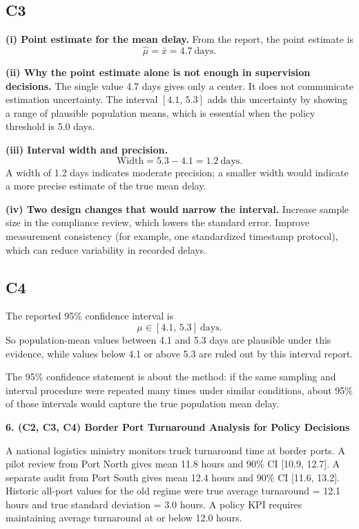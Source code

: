 \begin{ExamProblems}
		\subsection*{C3}
		\textbf{(i) Point estimate for the mean delay.}
		From the report, the point estimate is
		\[
		\hat{\mu}=\bar{x}=4.7\ \text{days}.
		\]
		
		\textbf{(ii) Why the point estimate alone is not enough in supervision decisions.}
		The single value 4.7 days gives only a center.
		It does not communicate estimation uncertainty.
		The interval $[4.1,\,5.3]$ adds this uncertainty by showing a range of plausible population means, which is essential when the policy threshold is 5.0 days.
		
		\textbf{(iii) Interval width and precision.}
		\[
		\text{Width}=5.3-4.1=1.2\ \text{days}.
		\]
		A width of 1.2 days indicates moderate precision; a smaller width would indicate a more precise estimate of the true mean delay.
		
		\textbf{(iv) Two design changes that would narrow the interval.}
		Increase sample size in the compliance review, which lowers the standard error.
		Improve measurement consistency (for example, one standardized timestamp protocol), which can reduce variability in recorded delays.
		
		\subsection*{C4}
		The reported 95\% confidence interval is
		\[
		\mu\in[4.1,\,5.3]\ \text{days}.
		\]
		So population-mean values between 4.1 and 5.3 days are plausible under this evidence, while values below 4.1 or above 5.3 are ruled out by this interval report.
		
		The 95\% confidence statement is about the method: if the same sampling and interval procedure were repeated many times under similar conditions, about 95\% of those intervals would capture the true population mean delay.
		
		\newpage
		\item
		\textbf{6. (C2, C3, C4) Border Port Turnaround Analysis for Policy Decisions}
		
		A national logistics ministry monitors truck turnaround time at border ports.
		A pilot review from Port North gives mean 11.8 hours and 90\% CI [10.9, 12.7].
		A separate audit from Port South gives mean 12.4 hours and 90\% CI [11.6, 13.2].
		Historic all-port values for the old regime were true average turnaround = 12.1 hours and true standard deviation = 3.0 hours.
		A policy KPI requires maintaining average turnaround at or below 12.0 hours.
		

\end{ExamProblems}
